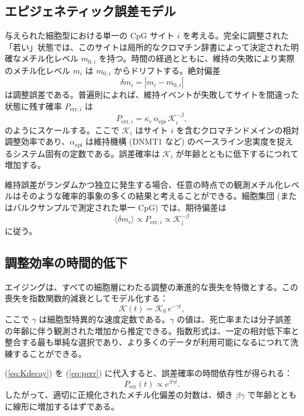 \documentclass[12pt,a4paper]{ltjsarticle}
\newcommand{\REL}{\mathcal{K}}          %
\begin{document}
	\subsection{エピジェネティック誤差モデル}
	与えられた細胞型における単一の CpG サイト \(i\) を考える。完全に調整された「若い」状態では、このサイトは局所的なクロマチン辞書によって決定された明確なメチル化レベル \(m_{0,i}\) を持つ。時間の経過とともに、維持の失敗により実際のメチル化レベル \(m_i\) は \(m_{0,i}\) からドリフトする。絶対偏差
	\[
	\delta m_i = |m_i - m_{0,i}|
	\]
	は調整誤差である。普遍則によれば、維持イベントが失敗してサイトを間違った状態に残す確率 \(P_{\mathrm{err},i}\) は
	\begin{equation}
		P_{\mathrm{err},i} = \kappa_c \, \alpha_{\mathrm{epi}} \, \REL_i^{-\beta},
		\label{eq:perr}
	\end{equation}
	のようにスケールする。ここで \(\REL_i\) はサイト \(i\) を含むクロマチンドメインの相対調整効率であり、\(\alpha_{\mathrm{epi}}\) は維持機構 (DNMT1 など) のベースライン忠実度を捉えるシステム固有の定数である。誤差確率は \(\REL_i\) が年齢とともに低下するにつれて増加する。
	
	維持誤差がランダムかつ独立に発生する場合、任意の時点での観測メチル化レベルはそのような確率的事象の多くの結果と考えることができる。細胞集団 (またはバルクサンプルで測定された単一 CpG) では、期待偏差は
	\[
	\langle \delta m_i \rangle \propto P_{\mathrm{err},i} \propto \REL_i^{-\beta}
	\]
	に従う。
	
	\subsection{調整効率の時間的低下}
	エイジングは、すべての細胞層にわたる調整の漸進的な喪失を特徴とする。この喪失を指数関数的減衰としてモデル化する：
	\begin{equation}
		\REL(t) = \REL_0 \, e^{-\gamma t},
		\label{eq:Kdecay}
	\end{equation}
	ここで \(\gamma\) は細胞型特異的な速度定数である。\(\gamma\) の値は、死亡率または分子誤差の年齢に伴う観測された増加から推定できる。指数形式は、一定の相対低下率と整合する最も単純な選択であり、より多くのデータが利用可能になるにつれて洗練することができる。
	
	(\ref{eq:Kdecay}) を (\ref{eq:perr}) に代入すると、誤差確率の時間依存性が得られる：
	\[
	P_{\mathrm{err}}(t) \propto e^{\beta\gamma t}.
	\]
	したがって、適切に正規化されたメチル化偏差の対数は、傾き \(\beta\gamma\) で年齢とともに線形に増加するはずである。
	
\end{document}
